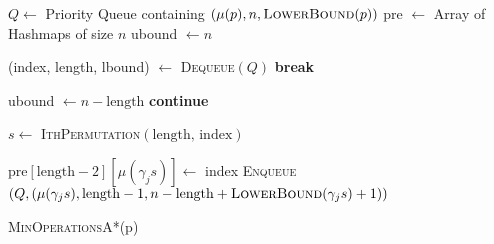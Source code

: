 \documentclass[a4paper, 10pt, ngerman]{article}
\begin{document}
\begin{algorithm}

    $Q \gets$ Priority Queue containing $(\mu(p), n, \textsc{LowerBound}(p))$ \;
    pre $\gets$ Array of Hashmaps of size $n$ \;
    ubound $\gets n$ \;

    {
        (index, length, lbound) $\gets$ \textsc{Dequeue}$(Q)$ \;
        {
            \textbf{break} \;
        }

        {
            {
                ubound $\gets n - \text{length}$ \;
            }
            \textbf{continue} \;
        }

        $s \gets$ \textsc{IthPermutation}$(\text{length, index})$ \;

        {
            {
                $\text{pre}[\text{length} - 2][\mu(\gamma_j s)] \gets$ index \;
                \textsc{Enqueue}$(Q, (\mu(\gamma_j s), \text{length} - 1, n - \text{length} + \textsc{LowerBound}(\gamma_j s) + 1))$ \;
            }
        }
    }

     \;

    \caption{\textsc{MinOperationsA*}(p)}
\end{algorithm}
\bigskip
\end{document}
